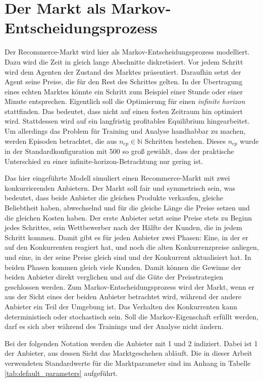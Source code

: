 \section{Der Markt als Markov-Entscheidungsprozess}
\label{section:markov}
Der Recommerce-Markt wird hier als Markov-Entscheidungsprozess modelliert.
Dazu wird die Zeit in gleich lange Abschnitte diskretisiert.
Vor jedem Schritt wird dem Agenten der Zustand des Marktes präsentiert.
Daraufhin setzt der Agent seine Preise, die für den Rest des Schrittes gelten.
In der Übertragung eines echten Marktes könnte ein Schritt zum Beispiel einer Stunde oder einer Minute entsprechen.
Eigentlich soll die Optimierung für einen \textit{infinite horizon} stattfinden.
Das bedeutet, dass nicht auf einen festen Zeitraum hin optimiert wird.
Stattdessen wird auf ein langfristig profitables Equilibrium hingearbeitet.
Um allerdings das Problem für Training und Analyse handhabbar zu machen, werden Episoden betrachtet, die aus $n_{ep} \in \mathbb{N}$ Schritten bestehen.
Dieses $n_{ep}$ wurde in der Standardkonfiguration mit 500 so groß gewählt, dass der praktische Unterschied zu einer infinite-horizon-Betrachtung nur gering ist.

Das hier eingeführte Modell simuliert einen Recommerce-Markt mit zwei konkurrierenden Anbietern.
Der Markt soll fair und symmetrisch sein, was bedeutet, dass beide Anbieter die gleichen Produkte verkaufen, gleiche Beliebtheit haben, abwechselnd und für die gleiche Länge die Preise setzen und die gleichen Kosten haben.
Der erste Anbieter setzt seine Preise stets zu Beginn jedes Schrittes, sein Wettbewerber nach der Hälfte der Kunden, die in jedem Schritt kommen.
Damit gibt es für jeden Anbieter zwei Phasen: Eine, in der er auf den Konkurrenten reagiert hat, und noch die alten Konkurrenzpreise anliegen, und eine, in der seine Preise gleich sind und der Konkurrent aktualisiert hat.
In beiden Phasen kommen gleich viele Kunden.
Damit können die Gewinne der beiden Anbieter direkt verglichen und auf die Güte der Preisstrategien geschlossen werden.
Zum Markov-Entscheidungsprozess wird der Markt, wenn er aus der Sicht eines der beiden Anbieter betrachtet wird, während der andere Anbieter ein Teil der Umgebung ist.
Das Verhalten des Konkurrenten kann deterministisch oder stochastisch sein.
Soll die Markov-Eigenschaft erfüllt werden, darf es sich aber während des Trainings und der Analyse nicht ändern.

Bei der folgenden Notation werden die Anbieter mit 1 und 2 indiziert.
Dabei ist 1 der Anbieter, aus dessen Sicht das Marktgeschehen abläuft.
Die in dieser Arbeit verwendeten Standardwerte für die Marktparameter sind im Anhang in Tabelle \ref{tab:default_parameters} aufgeführt.

